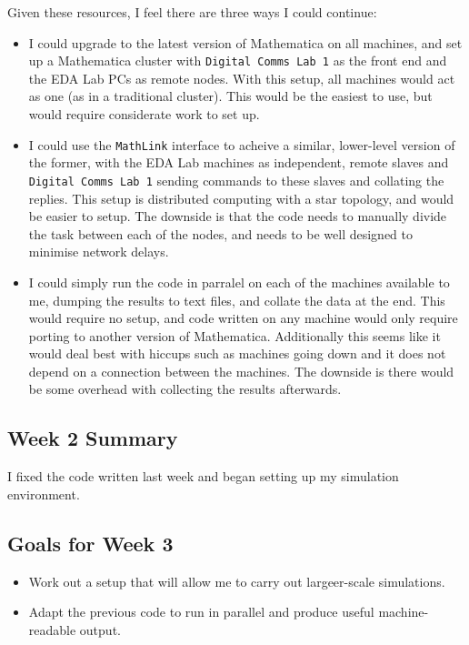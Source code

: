 Given these resources, I feel there are three ways I could continue:

\begin{itemize}
\itemsep1pt\parskip0pt
\item
  I could upgrade to the latest version of Mathematica on all machines,
  and set up a Mathematica cluster with \texttt{Digital Comms Lab 1} as
  the front end and the EDA Lab PCs as remote nodes. With this setup,
  all machines would act as one (as in a traditional cluster). This
  would be the easiest to use, but would require considerate work to set
  up.
\item
  I could use the \texttt{MathLink} interface to acheive a similar,
  lower-level version of the former, with the EDA Lab machines as
  independent, remote slaves and \texttt{Digital Comms Lab 1} sending
  commands to these slaves and collating the replies. This setup is
  distributed computing with a star topology, and would be easier to
  setup. The downside is that the code needs to manually divide the task
  between each of the nodes, and needs to be well designed to minimise
  network delays.
\item
  I could simply run the code in parralel on each of the machines
  available to me, dumping the results to text files, and collate the
  data at the end. This would require no setup, and code written on any
  machine would only require porting to another version of Mathematica.
  Additionally this seems like it would deal best with hiccups such as
  machines going down and it does not depend on a connection between the
  machines. The downside is there would be some overhead with collecting
  the results afterwards.
\end{itemize}

\subsection{Week 2 Summary}

I fixed the code written last week and began setting up my simulation
environment.

\subsection{Goals for Week 3}

\begin{itemize}
\itemsep1pt\parskip0pt
\item
  Work out a setup that will allow me to carry out largeer-scale
  simulations.
\item
  Adapt the previous code to run in parallel and produce useful
  machine-readable output.
\end{itemize}

